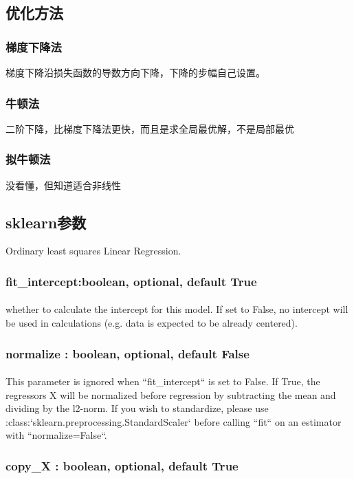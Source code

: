 \documentclass[18pt,a4paper,oneside,UTF8]{ctexart}
\begin{document}
\subsection{优化方法}
\subsubsection{梯度下降法}
梯度下降沿损失函数的导数方向下降，下降的步幅自己设置。
\subsubsection{牛顿法}
二阶下降，比梯度下降法更快，而且是求全局最优解，不是局部最优
\subsubsection{拟牛顿法}
没看懂，但知道适合非线性
\subsection{sklearn参数}
Ordinary least squares Linear Regression.
\subsubsection{fit\_intercept:boolean, optional, default True}
\paragraph{}whether to calculate the intercept for this model. If set
to False, no intercept will be used in calculations
(e.g. data is expected to be already centered).
\subsubsection{normalize : boolean, optional, default False}
\paragraph{}This parameter is ignored when ``fit\_intercept`` is set to False.
If True, the regressors X will be normalized before regression by
subtracting the mean and dividing by the l2-norm.
If you wish to standardize, please use
:class:`sklearn.preprocessing.StandardScaler` before calling ``fit`` on
an estimator with ``normalize=False``.
\subsubsection{copy\_X : boolean, optional, default True}
\end{document}
